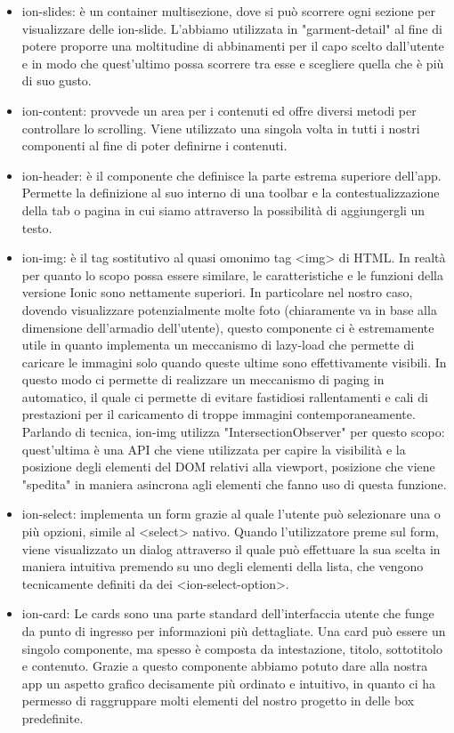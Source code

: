 \begin{itemize}
\item ion-slides: è un container multisezione, dove si può  scorrere ogni sezione per visualizzare delle ion-slide. L'abbiamo utilizzata in "garment-detail" al fine di potere proporre una moltitudine di abbinamenti per il capo scelto dall'utente e in modo che quest'ultimo possa scorrere tra esse e scegliere quella che è più di suo gusto.
\item ion-content: provvede un area per i contenuti ed offre diversi metodi per controllare lo scrolling. Viene utilizzato una singola volta in tutti i nostri componenti al fine di poter definirne i contenuti.
\item ion-header: è il componente che definisce la parte estrema superiore dell'app. Permette la definizione al suo interno di una toolbar e la contestualizzazione della tab o pagina in cui siamo attraverso la possibilità di aggiungergli un testo.
\item ion-img: è il tag sostitutivo al quasi omonimo tag <img> di HTML. In realtà  per quanto lo scopo possa essere similare, le caratteristiche e le funzioni della versione Ionic sono nettamente superiori. In particolare nel nostro caso, dovendo visualizzare potenzialmente molte foto (chiaramente va in base alla dimensione dell'armadio dell'utente), questo componente ci è estremamente utile in quanto implementa un meccanismo di lazy-load che permette di caricare le immagini solo quando queste ultime sono effettivamente visibili. In questo modo ci permette di realizzare un meccanismo di paging in automatico, il quale ci permette di evitare fastidiosi rallentamenti e cali di prestazioni per il caricamento di troppe immagini contemporaneamente. Parlando di tecnica, ion-img utilizza "IntersectionObserver" per questo scopo: quest'ultima è una API che viene utilizzata per capire la visibilità e la posizione degli elementi del DOM relativi alla viewport, posizione che viene "spedita" in maniera asincrona agli elementi che fanno uso di questa funzione. 
\item ion-select: implementa un form grazie al quale l'utente può selezionare una o più opzioni, simile al <select> nativo. Quando l'utilizzatore preme sul form, viene visualizzato un dialog attraverso il quale può effettuare la sua scelta in maniera intuitiva premendo su uno degli elementi della lista, che vengono tecnicamente definiti da dei <ion-select-option>.
\item ion-card:  Le cards sono una parte standard dell'interfaccia utente che funge da punto di ingresso per informazioni più dettagliate. Una card può essere un singolo componente, ma spesso è composta da intestazione, titolo, sottotitolo e contenuto. Grazie a questo componente abbiamo potuto dare alla nostra app un aspetto grafico decisamente più ordinato e intuitivo, in quanto ci ha permesso di raggruppare molti elementi del nostro progetto in delle box predefinite.

\end{itemize}

